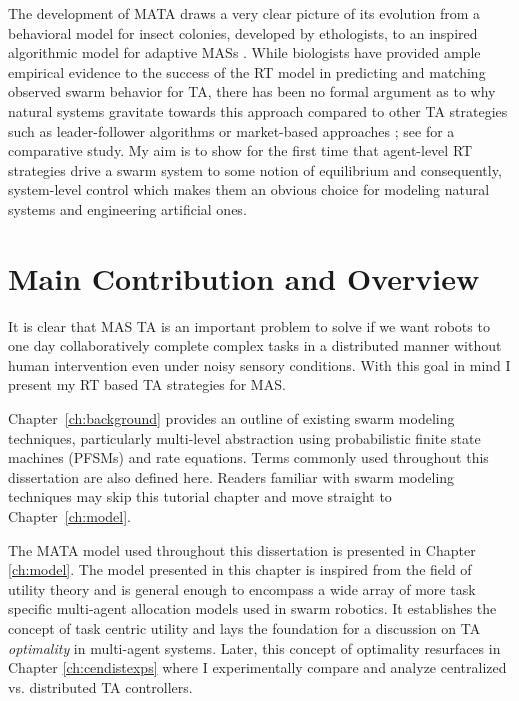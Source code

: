 \documentclass[12pt]{book}
\begin{document}
The development of MATA draws a very clear picture of its evolution from a behavioral model for insect colonies, developed by ethologists, to an inspired algorithmic model for adaptive MASs \cite{Krieger2000}. While biologists have provided ample empirical evidence to the success of the RT model in predicting and matching observed swarm behavior for TA, there has been no formal argument as to why natural systems gravitate towards this approach compared to other TA strategies such as leader-follower algorithms \cite{Chen2011} or market-based approaches \cite{Amstutz2008,Vig2007}; see \cite{Kalra2006} for a comparative study. My aim is to show for the first time that agent-level RT strategies drive a swarm system to some notion of equilibrium and consequently, system-level control which makes them an obvious choice for modeling natural systems and engineering artificial ones.

\section{Main Contribution and Overview}
It is clear that MAS TA is an important problem to solve if we want robots to one day collaboratively complete complex tasks in a distributed manner without human intervention even under noisy sensory conditions. With this goal in mind I present my RT based TA strategies for MAS.

Chapter~\ref{ch:background} provides an outline of existing swarm modeling techniques, particularly multi-level abstraction using probabilistic finite state machines (PFSMs) and rate equations. Terms commonly used throughout this dissertation are also defined here. Readers familiar with swarm modeling techniques may skip this tutorial chapter and move straight to Chapter~\ref{ch:model}. 

The MATA model used throughout this dissertation is presented in Chapter \ref{ch:model}. The model presented in this chapter is inspired from the field of utility theory and is general enough to encompass a wide array of more task specific multi-agent allocation models used in swarm robotics. It establishes the concept of task centric utility and lays the foundation for a discussion on TA \textit{optimality} in multi-agent systems. Later, this concept of optimality resurfaces in Chapter \ref{ch:cendistexps} where I experimentally compare and analyze centralized vs. distributed TA controllers.
\end{document}

